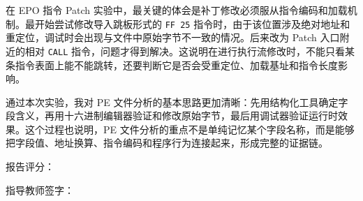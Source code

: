 ﻿\documentclass[12pt]{ctexart}
\begin{document}
在 EPO 指令 Patch 实验中，最关键的体会是补丁修改必须服从指令编码和加载机制。最开始尝试修改导入跳板形式的 \texttt{FF 25} 指令时，由于该位置涉及绝对地址和重定位，调试时会出现与文件中原始字节不一致的情况。后来改为 Patch 入口附近的相对 \texttt{CALL} 指令，问题才得到解决。这说明在进行执行流修改时，不能只看某条指令表面上能不能跳转，还要判断它是否会受重定位、加载基址和指令长度影响。

通过本次实验，我对 PE 文件分析的基本思路更加清晰：先用结构化工具确定字段含义，再用十六进制编辑器验证和修改原始字节，最后用调试器验证运行时效果。这个过程也说明，PE 文件分析的重点不是单纯记忆某个字段名称，而是能够把字段值、地址换算、指令编码和程序行为连接起来，形成完整的证据链。

\vspace{1.2cm}

\begin{flushright}
{\heiti{} 报告评分：}\qquad\qquad\qquad\qquad

\vspace{1.2cm}

{\heiti{} 指导教师签字：}\qquad\qquad\qquad

\end{flushright}
\end{document}
